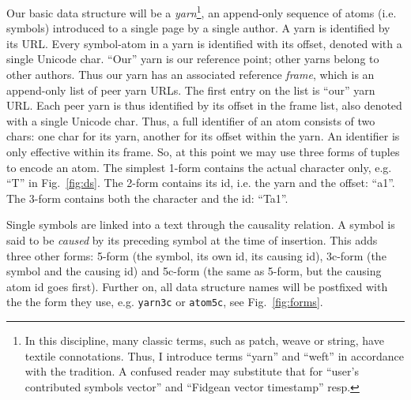 \documentclass{sig-alternate}
\begin{document}
Our basic data structure will be a \emph{yarn}\footnote{In this discipline, many classic terms, such as patch, weave or string, have textile connotations. Thus, I introduce terms ``yarn'' and ``weft'' in accordance with the tradition. A confused reader may substitute that for ``user's contributed symbols vector'' and ``Fidgean vector timestamp'' resp.}, an append-only sequence of atoms (i.e. symbols) introduced to a single page by a single author.
A yarn is identified by its URL.
Every symbol-atom in a yarn is identified with its offset, denoted with a single Unicode char.
``Our'' yarn is our reference point; other yarns belong to other authors.
Thus our yarn has an associated reference \emph{frame}, which is an append-only list of peer yarn URLs. The first entry on the list is ``our'' yarn URL.
Each peer yarn is thus identified by its offset in the frame list, also denoted with a single Unicode char.
Thus, a full identifier of an atom consists of two chars: one char for its yarn, another for its offset within the yarn.
An identifier is only effective within its frame.
So, at this point we may use three forms of tuples to encode an atom. The simplest 1-form contains the actual character only, e.g. ``T'' in Fig.~\ref{fig:ds}. The 2-form contains its id, i.e. the yarn and the offset: ``a1''. The 3-form contains both the character and the id: ``Ta1''.

Single symbols are linked into a text through the causality relation.
A symbol is said to be \emph{caused} by its preceding symbol at the time of insertion.
This adds three other forms: 5-form (the symbol, its own id, its causing id), 3c-form (the symbol and the causing id) and 5c-form (the same as 5-form, but the causing atom id goes first).
Further on, all data structure names will be postfixed with the the form they use, e.g. {\tt yarn3c} or {\tt atom5c}, see Fig.~\ref{fig:forms}.
\end{document}
